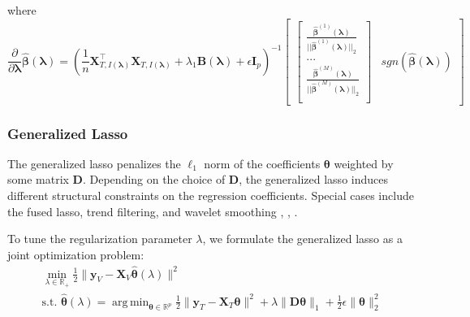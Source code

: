 \documentclass[12pt,letterpaper]{article}
\DeclareMathOperator*{\argmin}{arg\,min}
\begin{document}
where 
\begin{equation}
\frac{\partial}{\partial \boldsymbol \lambda} \hat{\boldsymbol{\beta}}(\boldsymbol{\lambda})
=
\left (
\frac{1}{n} \boldsymbol{X}_{T, I(\boldsymbol\lambda)}^\top \boldsymbol{X}_{T, I(\boldsymbol\lambda)}
+ \lambda_1 \boldsymbol{B}(\boldsymbol\lambda)
+ \epsilon \boldsymbol I_p
\right ) ^{-1}
\begin{bmatrix}
\begin{bmatrix}
\frac{\hat{\boldsymbol{\beta}}^{(1)}(\boldsymbol \lambda)}{||\hat{\boldsymbol{\beta}}^{(1)} (\boldsymbol \lambda)||_2}\\
...\\
\frac{\hat{\boldsymbol \beta}^{(M)} (\boldsymbol \lambda)}{||\hat{\boldsymbol{\beta}}^{(M)}(\boldsymbol \lambda)||_2}\\
\end{bmatrix}
&
sgn(\hat{\boldsymbol{\beta}}(\boldsymbol{\lambda}))
\end{bmatrix}
\end{equation}


\subsubsection{Generalized Lasso}
The generalized lasso \citep{roth2004generalized} penalizes the $\ell_1$ norm of the coefficients $\boldsymbol \theta$ weighted by some matrix $\boldsymbol D$. Depending on the choice of $\boldsymbol D$, the generalized lasso induces different structural constraints on the regression coefficients. Special cases include the fused lasso, trend filtering, and wavelet smoothing \citep{tibshirani2005sparsity}, \citep{kim2009ell_1}, \citep{donoho1994ideal}.

To tune the regularization parameter $\lambda$, we formulate the generalized lasso as a joint optimization problem:
\begin{equation}
\begin{array}{c}
\min_{\lambda \in \mathbb{R}_{+}} \frac{1}{2} \| \boldsymbol{y}_V - \boldsymbol{X}_V \hat{\boldsymbol{\theta}} (\lambda) \| ^2 \\
\text{s.t. }
\hat{\boldsymbol{\theta}} (\lambda) =
\argmin_{\boldsymbol{\theta} \in \mathbb{R}^p}
\frac{1}{2} \| \boldsymbol{y}_T - \boldsymbol{X}_T \boldsymbol{\theta} \| ^2
+ \lambda \| \boldsymbol D \boldsymbol{\theta} \|_1
+ \frac{1}{2} \epsilon \| \boldsymbol{\theta} \|_2^2
\end{array}
\label{genlasso}
\end{equation}
\end{document}
